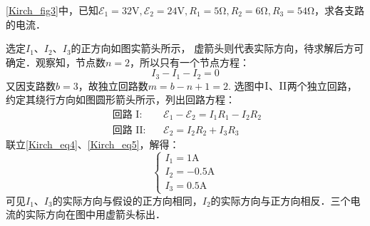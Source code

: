 \begin{example}{}
\autoref{Kirch_fig3}中，已知$\mathscr{E}_{1}=32 \mathrm{V}, \mathscr{E}_{2}=24 \mathrm{V}, R_{1}=5 \mathrm{\Omega}, R_{2}=6 \mathrm{\Omega}, R_{3}=54 \mathrm{Ω}$，求各支路的电流．

选定$I_1$、$I_2$、$I_3$的正方向如图实箭头所示， 虚箭头则代表实际方向，待求解后方可确定．观察知，节点数$n =2$，所以只有一个节点方程：
\begin{equation} \label{Kirch_eq4}
I_{3}-I_{1}-I_{2}=0
\end{equation}
又因支路数$b=3$，故独立回路数$m = b - n + 1 =2 $. 选图中$\rm I$、$\rm II$两个独立回路，约定其绕行方向如图圆形箭头所示，列出回路方程：
\begin{equation} \label{Kirch_eq5}
\begin{aligned}\text { 回路 } \mathrm{I}: && \mathscr{E}_{1}-\mathscr{E}_{2}=I_{1} R_{1}-I_{2} R_{2} \\ \text { 回路 } \mathrm{II}: && \mathscr{E}_{2}=I_{2} R_{2}+I_{3} R_{3}\end{aligned}
\end{equation}
联立\autoref{Kirch_eq4}、\autoref{Kirch_eq5}，解得：
\begin{equation}
\begin{cases}
I_{1}=1 \mathrm{A} \\ 
I_{2}=-0.5 \mathrm{A} \\
I_{3}=0.5 \mathrm{A}
\end{cases}
\end{equation}
可见$I_1$、$I_3$的实际方向与假设的正方向相同，$I_2$的实际方向与正方向相反．三个电流的实际方向在图中用虚箭头标出．
\end{example}

